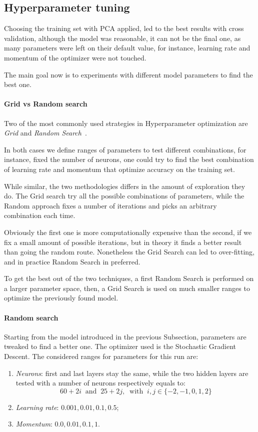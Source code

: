 \subsection{Hyperparameter tuning}

Choosing the training set with PCA applied, led to the best results 
with cross validation, although the model was reasonable, it can not be the 
final one, as many parameters were left on their default value, for instance, 
learning rate and momentum of the optimizer were not touched. 

The main goal now is to experiments with different model parameters 
to find the best one.

\paragraph{Grid vs Random search}
Two of the most commonly used strategies in Hyperparameter optimization
are \emph{Grid} and \emph{Random Search}~\cite{random-grid}. 

In both cases we define ranges of parameters to test different combinations, 
for instance, fixed the number of neurons, one could try to find the best 
combination of learning rate and momentum that optimize accuracy on the training set.

While similar, the two methodologies differs in the amount of exploration they do.
The Grid search try all the possible combinations of parameters, while the 
Random approach fixes a number of iterations and picks an arbitrary combination each time. 

Obviously the first one is more computationally expensive than the second, if 
we fix a small amount of possible iterations, but in theory it finds a better result
than going the random route. 
Nonetheless the Grid Search can led to over-fitting, and in practice Random 
Search in preferred.

To get the best out of the two techniques, a first Random Search is performed 
on a larger parameter space, then, a Grid Search is used on much smaller 
ranges to optimize the previously found model.

\paragraph{Random search}
Starting from the model introduced in the previous Subsection, parameters are 
tweaked to find a better one.
The optimizer used is the Stochastic Gradient Descent.
The considered ranges for parameters for this run are: 
\begin{enumerate}
    \item \emph{Neurons}: first and last layers stay the same, while 
    the two hidden layers are tested with a number of neurons respectively 
    equals to: 
    $$60 + 2i\;\;\text{and}\;\;25 + 2j,\;\;\text{with}\;\; i, j \in \{-2,-1,0,1,2\}$$
    \item \emph{Learning rate}: $0.001, 0.01, 0.1, 0.5$;
    \item \emph{Momentum}: $0.0, 0.01, 0.1, 1$.
\end{enumerate}

